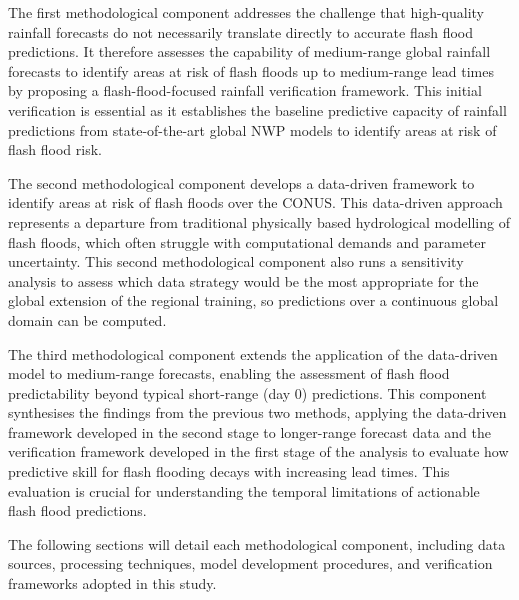 The  first methodological component addresses the challenge that high-quality rainfall forecasts do not necessarily translate directly to accurate flash flood predictions. It therefore assesses the capability of medium-range global rainfall forecasts to identify areas at risk of flash floods up to medium-range lead times by proposing a flash-flood-focused rainfall verification framework. This initial verification is essential as it establishes the baseline predictive capacity of rainfall predictions from state-of-the-art global NWP models to identify areas at risk of flash flood risk.

The  second methodological component develops a data-driven framework to identify areas at risk of flash floods over the CONUS. This data-driven approach represents a departure from traditional physically based hydrological modelling of flash floods, which often struggle with computational demands and parameter uncertainty. This second methodological component also runs a sensitivity analysis to assess which data strategy would be the most appropriate for the global extension of the regional training, so predictions over a continuous global domain can be computed.

The  third methodological component extends the application of the data-driven model to medium-range forecasts, enabling the assessment of flash flood predictability beyond typical short-range (day 0) predictions. This component synthesises the findings from the previous two methods, applying the data-driven framework developed in the second stage to longer-range forecast data and the verification framework developed in the first stage of the analysis to evaluate how predictive skill for flash flooding decays with increasing lead times. This evaluation is crucial for understanding the temporal limitations of actionable flash flood predictions.

The following sections will detail each methodological component, including data sources, processing techniques, model development procedures, and verification frameworks adopted in this study. 

